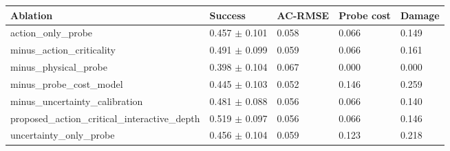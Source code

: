 \begin{tabular}{lllll}
\toprule
Ablation & Success & AC-RMSE & Probe cost & Damage \\
\midrule
action\_only\_probe & 0.457 $\pm$ 0.101 & 0.058 & 0.066 & 0.149 \\
minus\_action\_criticality & 0.491 $\pm$ 0.099 & 0.059 & 0.066 & 0.161 \\
minus\_physical\_probe & 0.398 $\pm$ 0.104 & 0.067 & 0.000 & 0.000 \\
minus\_probe\_cost\_model & 0.445 $\pm$ 0.103 & 0.052 & 0.146 & 0.259 \\
minus\_uncertainty\_calibration & 0.481 $\pm$ 0.088 & 0.056 & 0.066 & 0.140 \\
proposed\_action\_critical\_interactive\_depth & 0.519 $\pm$ 0.097 & 0.056 & 0.066 & 0.146 \\
uncertainty\_only\_probe & 0.456 $\pm$ 0.104 & 0.059 & 0.123 & 0.218 \\
\bottomrule
\end{tabular}
